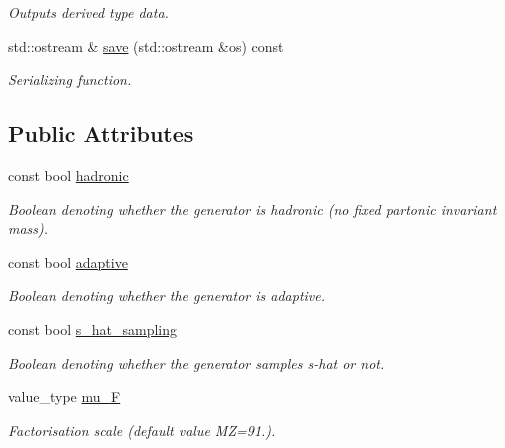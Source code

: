 \begin{DoxyCompactItemize}
\begin{DoxyCompactList}\small\item\em Outputs derived type data. \end{DoxyCompactList}\item 
\hypertarget{a00304_a5c900580412b7b10979407009a37eff9}{std\-::ostream \& \hyperlink{a00304_a5c900580412b7b10979407009a37eff9}{save} (std\-::ostream \&os) const }\label{a00304_a5c900580412b7b10979407009a37eff9}

\begin{DoxyCompactList}\small\item\em Serializing function. \end{DoxyCompactList}\end{DoxyCompactItemize}
\subsection*{Public Attributes}
\begin{DoxyCompactItemize}
\item 
const bool \hyperlink{a00304_afc30246f82f7c9c7cea2e355ed7b55bf}{hadronic}
\begin{DoxyCompactList}\small\item\em Boolean denoting whether the generator is hadronic (no fixed partonic invariant mass). \end{DoxyCompactList}\item 
\hypertarget{a00304_acecbc0518b41515b44388c5cbd10934d}{const bool \hyperlink{a00304_acecbc0518b41515b44388c5cbd10934d}{adaptive}}\label{a00304_acecbc0518b41515b44388c5cbd10934d}

\begin{DoxyCompactList}\small\item\em Boolean denoting whether the generator is adaptive. \end{DoxyCompactList}\item 
\hypertarget{a00304_ab98815354277395330a88d2324d1f0ec}{const bool \hyperlink{a00304_ab98815354277395330a88d2324d1f0ec}{s\-\_\-hat\-\_\-sampling}}\label{a00304_ab98815354277395330a88d2324d1f0ec}

\begin{DoxyCompactList}\small\item\em Boolean denoting whether the generator samples s-\/hat or not. \end{DoxyCompactList}\item 
\hypertarget{a00304_a57bb53eb0519734bc80f2d461abbfa0e}{value\-\_\-type \hyperlink{a00304_a57bb53eb0519734bc80f2d461abbfa0e}{mu\-\_\-\-F}}\label{a00304_a57bb53eb0519734bc80f2d461abbfa0e}

\begin{DoxyCompactList}\small\item\em Factorisation scale (default value M\-Z=91.). \end{DoxyCompactList}\end{DoxyCompactItemize}
